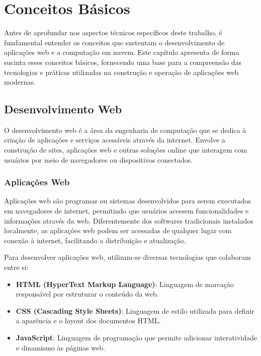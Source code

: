 \section{Conceitos Básicos}

Antes de aprofundar nos aspectos técnicos específicos deste trabalho, é fundamental entender os conceitos que sustentam o desenvolvimento de aplicações web e a computação em nuvem. Este capítulo apresenta de forma sucinta esses conceitos básicos, fornecendo uma base para a compreensão das tecnologias e práticas utilizadas na construção e operação de aplicações web modernas.

\subsection{Desenvolvimento Web}

O desenvolvimento web é a área da engenharia de computação que se dedica à criação de aplicações e serviços acessíveis através da internet. Envolve a construção de sites, aplicações web e outras soluções online que interagem com usuários por meio de navegadores ou dispositivos conectados.

\subsubsection{Aplicações Web}


Aplicações web são programas ou sistemas desenvolvidos para serem executados em navegadores de internet, permitindo que usuários acessem funcionalidades e informações através da web. Diferentemente dos softwares tradicionais instalados localmente, as aplicações web podem ser acessadas de qualquer lugar com conexão à internet, facilitando a distribuição e atualização. \cite{web-app}

Para desenvolver aplicações web, utilizam-se diversas tecnologias que colaboram entre si:

\begin{itemize}
    \item \textbf{HTML (HyperText Markup Language)}: Linguagem de marcação responsável por estruturar o conteúdo da web.
    \item \textbf{CSS (Cascading Style Sheets)}: Linguagem de estilo utilizada para definir a aparência e o layout dos documentos HTML.
    \item \textbf{JavaScript}: Linguagem de programação que permite adicionar interatividade e dinamismo às páginas web.
\end{itemize}

